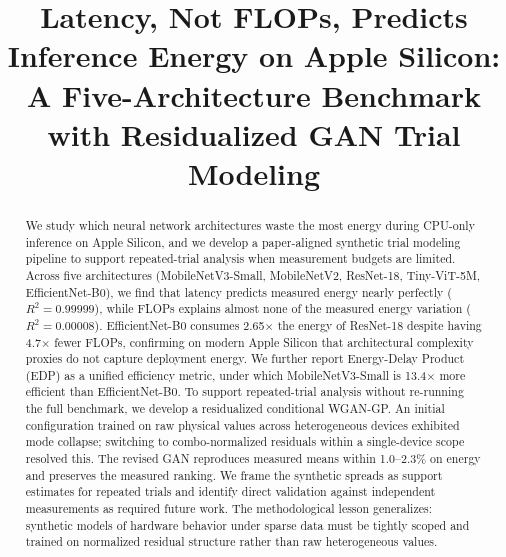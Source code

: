 \documentclass[conference]{IEEEtran}
\begin{document}
\title{Latency, Not FLOPs, Predicts Inference Energy on Apple Silicon: \\
A Five-Architecture Benchmark with Residualized GAN Trial Modeling}

\author{
\and
{}
}

\maketitle

\begin{abstract}
We study which neural network architectures waste the most energy during
CPU-only inference on Apple Silicon, and we develop a paper-aligned synthetic
trial modeling pipeline to support repeated-trial analysis when measurement
budgets are limited. Across five architectures (MobileNetV3-Small, MobileNetV2,
ResNet-18, Tiny-ViT-5M, EfficientNet-B0), we find that latency predicts
measured energy nearly perfectly ($R^2 = 0.99999$), while FLOPs explains
almost none of the measured energy variation ($R^2 = 0.00008$). EfficientNet-B0 consumes 2.65$\times$ the
energy of ResNet-18 despite having 4.7$\times$ fewer FLOPs, confirming on
modern Apple Silicon that architectural complexity proxies do not capture
deployment energy. We further report Energy-Delay Product (EDP) as a unified
efficiency metric, under which MobileNetV3-Small is 13.4$\times$ more efficient
than EfficientNet-B0. To support repeated-trial analysis without re-running the
full benchmark, we develop a residualized conditional WGAN-GP. An initial
configuration trained on raw physical values across heterogeneous devices
exhibited mode collapse; switching to combo-normalized residuals within a
single-device scope resolved this. The revised GAN reproduces measured means
within 1.0--2.3\% on energy and preserves the measured ranking. We frame the
synthetic spreads as support estimates for repeated trials and identify direct
validation against independent measurements as required future work. The
methodological lesson generalizes: synthetic models of hardware behavior under
sparse data must be tightly scoped and trained on normalized residual structure
rather than raw heterogeneous values.
\end{abstract}
\end{document}
